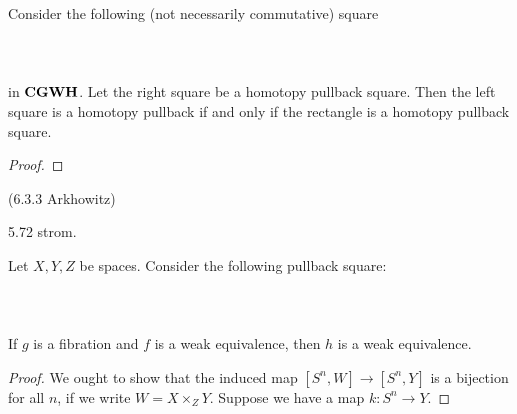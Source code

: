 \documentclass[a4paper]{article}
\begin{document}
\begin{prp}{}{} Consider the following (not necessarily commutative) square \\~\\
\\~\\
in $\bold{CGWH}$. Let the right square be a homotopy pullback square. Then the left square is a homotopy pullback if and only if the rectangle is a homotopy pullback square. \tcbline
\begin{proof}

\end{proof}
\end{prp} (6.3.3 Arkhowitz)

5.72 strom. 

\begin{prp}{}{} Let $X,Y,Z$ be spaces. Consider the following pullback square: \\~\\
\\~\\
If $g$ is a fibration and $f$ is a weak equivalence, then $h$ is a weak equivalence. \tcbline
\begin{proof}
We ought to show that the induced map $[S^n,W]\to[S^n,Y]$ is a bijection for all $n$, if we write $W=X\times_ZY$. Suppose we have a map $k:S^n\to Y$. 
\end{proof}
\end{prp}
\end{document}
